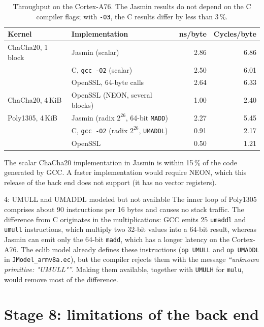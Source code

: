 \documentclass[11pt,a4paper]{article}
\newcommand{\file}[1]{\texttt{#1}}
\begin{document}
\begin{table}[h]
\centering\small
\begin{tabular}{@{}llrr@{}}
\toprule
\textbf{Kernel} & \textbf{Implementation} & \textbf{ns/byte} & \textbf{Cycles/byte} \\
\midrule
ChaCha20, 1 block & Jasmin (scalar) & 2.86 & 6.86 \\
                  & C, \texttt{gcc -O2} (scalar) & 2.50 & 6.01 \\
                  & OpenSSL, 64-byte calls & 2.64 & 6.33 \\
ChaCha20, 4\,KiB  & OpenSSL (NEON, several blocks) & 1.00 & 2.40 \\
\midrule
Poly1305, 4\,KiB  & Jasmin (radix $2^{26}$, 64-bit \texttt{MADD}) & 2.27 & 5.45 \\
                  & C, \texttt{gcc -O2} (radix $2^{26}$, \texttt{UMADDL}) & 0.91 & 2.17 \\
                  & OpenSSL & 0.50 & 1.21 \\
\bottomrule
\end{tabular}
\caption{Throughput on the Cortex-A76. The Jasmin results do not depend on
the C compiler flags; with \texttt{-O3}, the C results differ by less than
3\,\%.}
\end{table}

The scalar ChaCha20 implementation in Jasmin is within 15\,\% of the code
generated by GCC. A faster implementation would require NEON, which this
release of the back end does not support (it has no vector registers).

\begin{finding}{4: UMULL and UMADDL modeled but not available}
The inner loop of Poly1305 comprises about 90 instructions per 16 bytes and
causes no stack traffic. The difference from C originates in the
multiplications: GCC emits 25 \texttt{umaddl} and \texttt{umull}
instructions, which multiply two 32-bit values into a 64-bit result, whereas Jasmin can
emit only the 64-bit \texttt{madd}, which has a longer latency on the
Cortex-A76. The eclib model already defines these instructions
(\texttt{op UMULL} and \texttt{op UMADDL} in \file{JModel\_armv8a.ec}), but
the compiler rejects them with the message \emph{``unknown primitive:
"UMULL"''}. Making them available, together with \texttt{UMULH} for
\texttt{mulu}, would remove most of the difference.
\end{finding}

\section{Stage 8: limitations of the back end}
\end{document}
